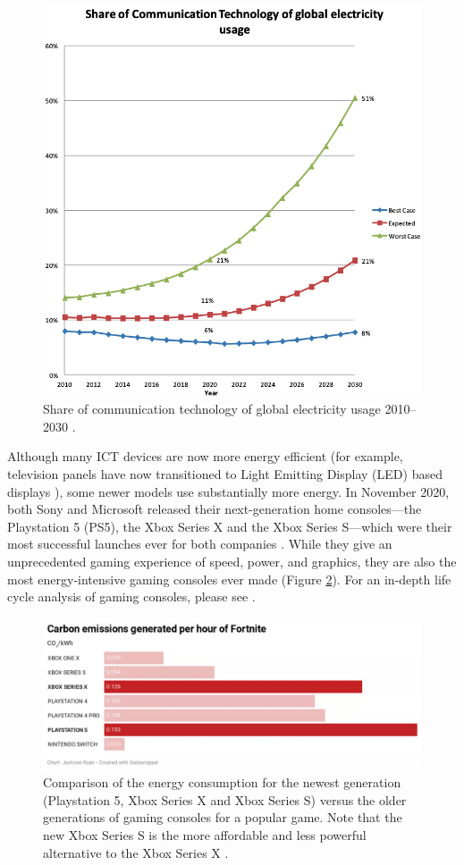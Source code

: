 \documentclass{article}
\begin{document}
\begin{figure}[h]
    \includegraphics[width=.7 \textwidth]{./images/Global_Energy_ICT_share.png}
    \centering
    \caption{Share of communication technology of global electricity usage 2010–2030 \cite{andrae2015global}.}
    \label{Global_Energy_ICT_share}
\end{figure}

Although many ICT devices are now more energy efficient (for example, television panels have now transitioned to Light Emitting Display (LED) based displays \cite{park2013efficiency}), some newer models use substantially more energy. In November 2020, both Sony and Microsoft released their next-generation home consoles---the Playstation 5 (PS5), the Xbox Series X and the Xbox Series S---which were their most successful launches ever for both companies \cite{cnet2020gamingconsoles}. While they give an unprecedented gaming experience of speed, power, and graphics, they are also the most energy-intensive gaming consoles ever made (Figure \ref{usage_gaming_consoles}). For an in-depth life cycle analysis of gaming consoles, please see \cite{aslan2020climate}.

\begin{figure}[h]
    \includegraphics[width=.9 \textwidth]{./images/usage_gaming_consoles.png}
    \centering
    \caption{Comparison of the energy consumption for the newest generation (Playstation 5, Xbox Series X and Xbox Series S) versus the older generations of gaming consoles for a popular game. Note that the new Xbox Series S is the more affordable and less powerful alternative to the Xbox Series X \cite{cnet2020gamingconsoles}.}
    \label{usage_gaming_consoles}
\end{figure}
\end{document}
